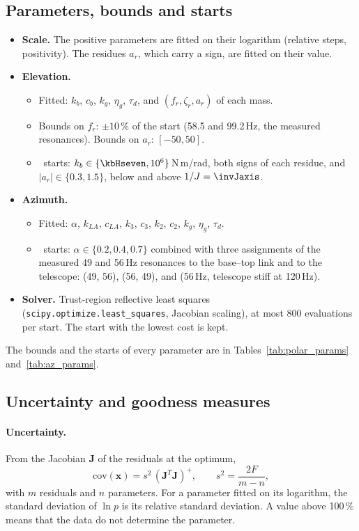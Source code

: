 \documentclass[10pt,a4paper]{article}
\numberwithin{equation}{section}
\begin{document}
\subsection{Parameters, bounds and starts}
\begin{itemize}
\item \textbf{Scale.} The positive parameters are fitted on their logarithm (relative steps, positivity). The residues $a_r$, which carry a sign, are fitted on their value.
\item \textbf{Elevation.}
  \begin{itemize}
  \item Fitted: $k_b$, $c_b$, $k_g$, $\eta_g$, $\tau_d$, and $(f_r,\zeta_r,a_r)$ of each mass.
  \item Bounds on $f_r$: $\pm10\,\%$ of the start (58.5 and 99.2\,Hz, the measured resonances). Bounds on $a_r$: $[-50,50]$.
  \item \nStartsP\ starts: $k_b\in\{\kbHseven,10^6\}$\,N\,m/rad, both signs of each residue, and $|a_r|\in\{0.3,1.5\}$, below and above $1/J=\invJaxis$.
  \end{itemize}
\item \textbf{Azimuth.}
  \begin{itemize}
  \item Fitted: $\alpha$, $k_{LA}$, $c_{LA}$, $k_3$, $c_3$, $k_2$, $c_2$, $k_g$, $\eta_g$, $\tau_d$.
  \item \nStartsA\ starts: $\alpha\in\{0.2,0.4,0.7\}$ combined with three assignments of the measured 49 and 56\,Hz resonances to the base--top link and to the telescope: (49, 56), (56, 49), and (56\,Hz, telescope stiff at 120\,Hz).
  \end{itemize}
\item \textbf{Solver.} Trust-region reflective least squares (\texttt{scipy.optimize.least\_squares}, Jacobian scaling), at most 800 evaluations per start. The start with the lowest cost is kept.
\end{itemize}
The bounds and the starts of every parameter are in Tables~\ref{tab:polar_params} and~\ref{tab:az_params}.

\subsection{Uncertainty and goodness measures}
\paragraph{Uncertainty.} From the Jacobian $\mathbf J$ of the residuals at the optimum,
\begin{equation}
\mathrm{cov}(\mathbf x)=s^2\,(\mathbf J^T\mathbf J)^{+},\qquad s^2=\frac{2F}{m-n},
\end{equation}
with $m$ residuals and $n$ parameters. For a parameter fitted on its logarithm, the standard deviation of $\ln p$ is its relative standard deviation. A value above 100\,\% means that the data do not determine the parameter.
\end{document}
